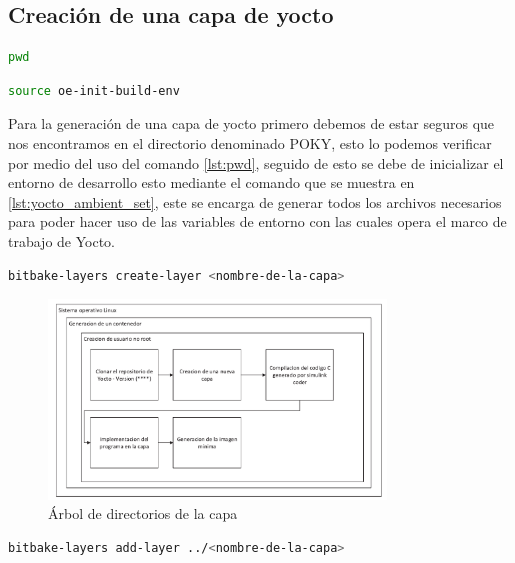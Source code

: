 \subsection{Creación de una capa de yocto}

\begin{lstlisting}[language=bash, caption={"Print Working Directory",Linux}, label=lst:pwd]
    pwd
\end{lstlisting}

\begin{lstlisting}[language=bash, caption={Inicializar ambiente, Yocto}, label=lst:yocto_ambient_set]
    source oe-init-build-env
\end{lstlisting}

Para la generación de una capa de yocto primero debemos de estar seguros que nos encontramos en el directorio denominado POKY, esto lo podemos verificar por medio del uso del comando \ref{lst:pwd}, seguido de esto se debe de inicializar el entorno de desarrollo esto mediante el comando que se muestra en \ref{lst:yocto_ambient_set}, este se encarga de generar todos los archivos necesarios para poder hacer uso de las variables de entorno con las cuales opera el marco de trabajo de Yocto.

\begin{lstlisting}[language=bash, caption={Generar nueva capa, Yocto }, label=lst:yocto_new_layer]
    bitbake-layers create-layer <nombre-de-la-capa>
\end{lstlisting}

\begin{figure}[h!]
    \centering
    \includegraphics[width=0.8\textwidth]{fig/especifico_2/Flujo de trabajo de mi idea.pdf}
    \caption{Árbol de directorios de la capa}
    \label{fig:arbol_capa_custom_yocto}
\end{figure}

\begin{lstlisting}[language=bash, caption={Agregar nueva capa, Yocto }, label=lst:add_new_layer]
    bitbake-layers add-layer ../<nombre-de-la-capa>
\end{lstlisting}

